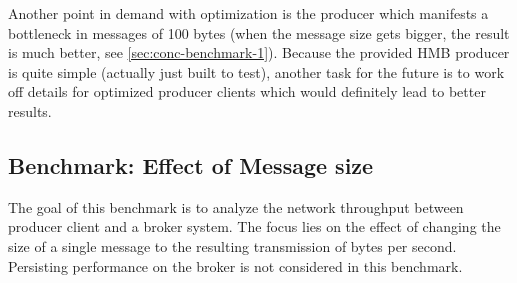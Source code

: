 Another point in demand with optimization is the producer which manifests a
bottleneck in messages of 100 bytes (when the message size gets bigger, the
result is much better, see \ref{sec:conc-benchmark-1}). Because the provided
HMB producer is quite simple (actually just built to test), another task for
the future is to work off details for optimized producer clients which would
definitely lead to better results. 

\newpage
\subsection{Benchmark: Effect of Message size}
\label{sec:conc-benchmark-2}
The goal of this benchmark is to analyze the network throughput between
producer client and a broker system. The focus lies on the effect of changing the
size of a single message to the resulting transmission of bytes per
second. Persisting performance on the broker is not considered in
this benchmark.


